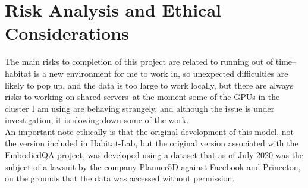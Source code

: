 \documentclass{article}
\begin{document}
\section{Risk Analysis and Ethical Considerations}
The main risks to completion of this project are related to running out of time--habitat is a new environment for me to work in, so unexpected difficulties are likely to pop up, and the data is too large to work locally, but there are always risks to working on shared servers--at the moment some of the GPUs in the cluster I am using are behaving strangely, and although the issue is under investigation, it is slowing down some of the work. \\
An important note ethically is that the original development of this model, not the version included in Habitat-Lab, but the original version associated with the EmbodiedQA project, was developed using a dataset that as of July 2020 was the subject of a lawsuit by the company Planner5D against Facebook and Princeton, on the grounds that the data was accessed without permission\cite{planner5d}.




\end{document}

